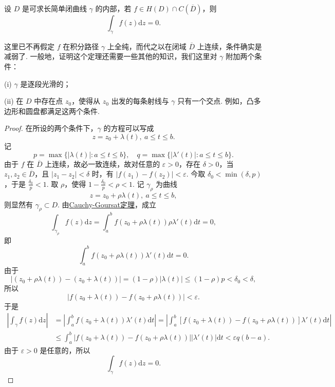 \documentclass[../../main.tex]{subfiles}%
\begin{document}
\begin{theorem}\label{theorem:定理3.2.4}
设 \( D \) 是可求长简单闭曲线 \( \gamma \) 的内部，若 \( f \in H(D) \cap C(\overline{D}) \)，则
\[
\int_\gamma f(z)\mathrm{d}z = 0.
\]
\end{theorem}
\begin{remark}
这里已不再假定 \( f \) 在积分路径 \( \gamma \) 上全纯，而代之以在闭域 \( \overline{D} \) 上连续，条件确实是减弱了. 一般地，证明这个定理还需要一些其他的知识，我们这里对 \( \gamma \) 附加两个条件：

(i) \( \gamma \) 是逐段光滑的；

(ii) 在 \( D \) 中存在点 \( z_0 \)，使得从 \( z_0 \) 出发的每条射线与 \( \gamma \) 只有一个交点. 例如，凸多边形和圆盘都满足这两个条件.
\end{remark}
\begin{proof}
在所设的两个条件下，\( \gamma \) 的方程可以写成
\[
z = z_0 + \lambda(t),\ a \leqslant t \leqslant b.
\]
记
\[
p = \max\{ |\lambda(t)| : a \leqslant t \leqslant b \},
\quad
q = \max\{ |\lambda'(t)| : a \leqslant t \leqslant b \}.
\]
由于 \( f \) 在 \( \overline{D} \) 上连续，故必一致连续，故对任意的 \( \varepsilon > 0 \)，存在 \( \delta > 0 \)，当 \( z_1, z_2 \in \overline{D} \)，且 \( |z_1 - z_2| < \delta \) 时，有 \( |f(z_1) - f(z_2)| < \varepsilon \). 今取 \( \delta_0 < \min(\delta, p) \)，于是 \( \frac{\delta_0}{p} < 1 \). 取 \( \rho \)，使得 \( 1 - \frac{\delta_0}{p} < \rho < 1 \). 记 \( \gamma_\rho \) 为曲线
\[
z = z_0 + \rho\lambda(t),\ a \leqslant t \leqslant b,
\]
则显然有 \( \gamma_\rho \subset D \). 由\hyperref[theorem:Cauchy-Goursat定理(Cauchy积分定理)]{Cauchy-Goursat定理}，成立
\[
\int_{\gamma_\rho} f(z)\mathrm{d}z = \int_a^b f(z_0 + \rho\lambda(t))\rho\lambda'(t)\mathrm{d}t = 0,
\]
即
\[
\int_a^b f(z_0 + \rho\lambda(t))\lambda'(t)\mathrm{d}t = 0.
\]
由于
\[
|(z_0 + \rho\lambda(t)) - (z_0 + \lambda(t))| = (1 - \rho)|\lambda(t)|
\leqslant (1 - \rho)p
< \delta_0 < \delta,
\]
所以
\[
|f(z_0 + \lambda(t)) - f(z_0 + \rho\lambda(t))| < \varepsilon.
\]
于是
\begin{align*}
\left| \int_\gamma f(z)\mathrm{d}z \right| &= \left| \int_a^b f(z_0 + \lambda(t))\lambda'(t)\mathrm{d}t \right|
= \left| \int_a^b [f(z_0 + \lambda(t)) - f(z_0 + \rho\lambda(t))]\lambda'(t)\mathrm{d}t \right|
\\
&\leqslant \int_a^b |f(z_0 + \lambda(t)) - f(z_0 + \rho\lambda(t))||\lambda'(t)|\mathrm{d}t
< \varepsilon q(b - a).
\end{align*}
由于 \( \varepsilon > 0 \) 是任意的，所以
\[
\int_\gamma f(z)\mathrm{d}z = 0.
\]
\end{proof}
\end{document}
